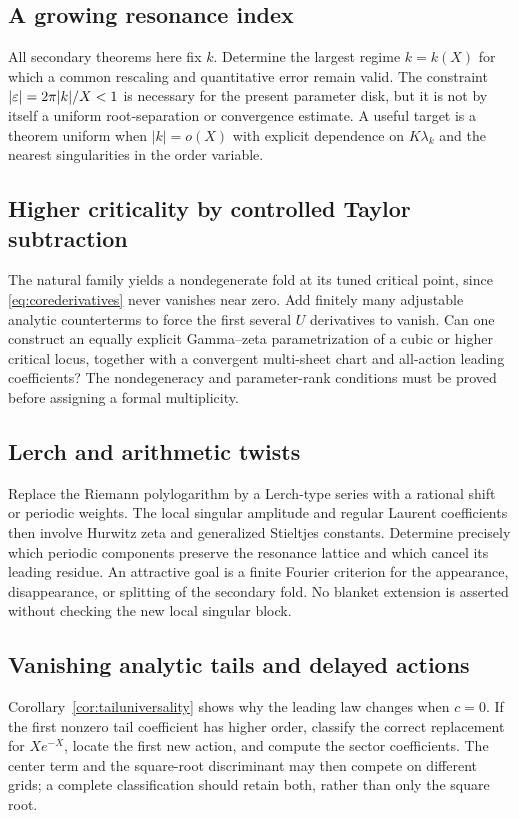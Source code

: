\documentclass[11pt,a4paper]{article}
\numberwithin{equation}{section}
\theoremstyle{definition}\newtheorem{definition}[theorem]{Definition}
\theoremstyle{remark}\newtheorem{remark}[theorem]{Remark}
\begin{document}
\subsection{A growing resonance index}
All secondary theorems here fix $k$. Determine the largest regime
$k=k(X)$ for which a common rescaling and quantitative error remain valid.
The constraint $|\varepsilon|=2\pi|k|/X<1$ is necessary for the present parameter
disk, but it is not by itself a uniform root-separation or convergence
estimate. A useful target is a theorem uniform when $|k|=o(X)$ with
explicit dependence on $K\lambda_k$ and the nearest singularities in the
order variable.

\subsection{Higher criticality by controlled Taylor subtraction}
The natural family yields a nondegenerate fold at its tuned critical
point, since \eqref{eq:corederivatives} never vanishes near zero.
Add finitely many adjustable analytic counterterms to force the first
several $U$ derivatives to vanish. Can one construct an equally explicit
Gamma--zeta parametrization of a cubic or higher critical locus, together
with a convergent multi-sheet chart and all-action leading coefficients?
The nondegeneracy and parameter-rank conditions must be proved before
assigning a formal multiplicity.

\subsection{Lerch and arithmetic twists}
Replace the Riemann polylogarithm by a Lerch-type series with a rational
shift or periodic weights. The local singular amplitude and regular
Laurent coefficients then involve Hurwitz zeta and generalized Stieltjes
constants. Determine precisely which periodic components preserve the
resonance lattice and which cancel its leading residue. An attractive
goal is a finite Fourier criterion for the appearance, disappearance,
or splitting of the secondary fold. No blanket extension is asserted
without checking the new local singular block.

\subsection{Vanishing analytic tails and delayed actions}
Corollary~\ref{cor:tailuniversality} shows why the leading law changes
when $c=0$. If the first nonzero tail coefficient has higher order,
classify the correct replacement for $Xe^{-X}$, locate the first new
action, and compute the sector coefficients. The center term and the
square-root discriminant may then compete on different grids; a complete
classification should retain both, rather than only the square root.
\end{document}

